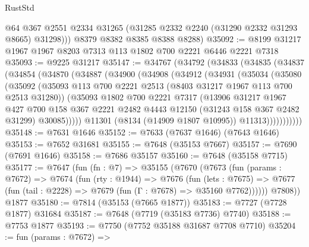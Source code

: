 \begin{lexlean}{RustStd}
\begin{coremodule}
          @64
          @367
          @2551
          @2334
          @31265
          (@31285 @2332 @2240 (@31290 @2332 @31293 @8665) @31298)))
      @8379
      @8382
      @8385
      @8388
      @8288)
@35092 := @8199 @31217 @1967 @1967 @8203 @7313 @113 @1802 @700 @2221 @6446 @2221 @7318
@35093 := @9225 @31217
@35147 := @34767
    (@34792
      (@34833
        (@34835
          (@34837
            (@34854
              (@34870
                (@34887
                  (@34900
                    (@34908
                      (@34912
                        (@34931
                          (@35034
                            (@35080
                              (@35092
                                (@35093
                                  @113
                                  @700
                                  @2221
                                  @2513
                                  (@8403 @31217 @1967 @113 @700 @2513 @31280))
                                (@35093
                                  @1802
                                  @700
                                  @2221
                                  @7317
                                  (@13906
                                    @31217
                                    @1967
                                    @427
                                    @700
                                    @158
                                    @367
                                    @2221
                                    @2482
                                    @4443
                                    @12150
                                    (@31243 @158 @367 @2482 @31299)
                                    @30085)))))
                          @11301
                          (@8134 (@14909 @1807 @10995))
                          @11313)))))))))))
@35148 := @7631 @1646
@35152 := @7633 (@7637 @1646) (@7643 @1646)
@35153 := @7652 @31681
@35155 := @7648 (@35153 @7667)
@35157 := @7690 (@7691 @1646)
@35158 := @7686 @35157
@35160 := @7648 (@35158 @7715)
@35177 := @7647
    (fun (fn : @7) =>
    @35155
      (@7670
        (@7673
          (fun (params : @7672) =>
          @7674
            (fun (rty : @1944) =>
            @7676
              (fun (lets : @7675) =>
              @7677 (fun (tail : @2228) => @7679 (fun (Γ : @7678) => @35160 @7762))))))
        @7808))
    @1877
@35180 := @7814 (@35153 (@7665 @1877))
@35183 := @7727 (@7728 @1877) @31684
@35187 := @7648 (@7719 (@35183 @7736) @7740)
@35188 := @7753 @1877
@35193 := @7750 (@7752 @35188 @31687 @7708 @7710)
@35204 := fun (params : @7672) =>

\end{coremodule}
\end{lexlean}

